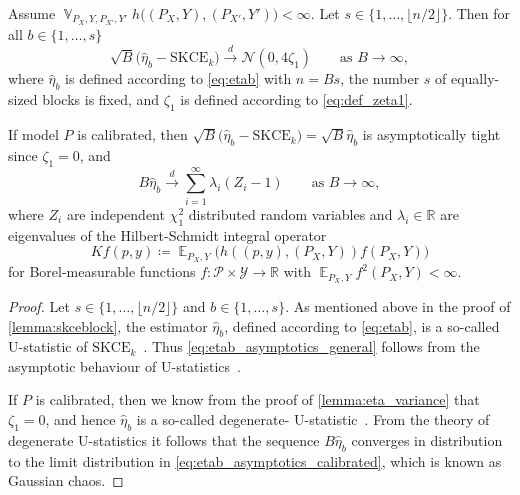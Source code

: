 \documentclass{article}
\DeclareMathOperator{\Exp}{\mathbb{E}}
\DeclareMathOperator{\Var}{\mathbb{V}}
\begin{document}
\begin{corollary}\label{corr:eta_limit}
Assume $\Var_{P_X,Y,P_{X'},Y'} h\big((P_X, Y), (P_{X'}, Y')\big) < \infty$.
Let $s \in \{1, \ldots, \lfloor n / 2 \rfloor \}$. Then for all
$b \in \{1, \ldots, s\}$
\begin{equation}\label{eq:etab_asymptotics_general}
    \sqrt{B} \big(\widehat{\eta}_{b} - \mathrm{SKCE}_k\big)
    \xrightarrow{d} \mathcal{N}(0, 4 \zeta_1) \qquad \text{as } B \to \infty,
\end{equation}
where $\widehat{\eta}_b$ is defined according to \cref{eq:etab} with
$n = B s$, the number $s$ of equally-sized blocks is fixed,
and $\zeta_1$ is defined according to \cref{eq:def_zeta1}.

If model $P$ is calibrated, then
$\sqrt{B}\big(\widehat{\eta}_{b} - \mathrm{SKCE}_k\big)
= \sqrt{B} \widehat{\eta}_{b}$
is
asymptotically tight since $\zeta_1 = 0$, and
\begin{equation}\label{eq:etab_asymptotics_calibrated}
    B \widehat{\eta}_{b} \xrightarrow{d} \sum_{i=1}^\infty \lambda_i (Z_i - 1) \qquad \text{as } B \to \infty,
\end{equation}
where $Z_i$ are independent $\chi^2_1$ distributed random variables
and $\lambda_i \in \mathbb{R}$ are eigenvalues of the Hilbert-Schmidt integral
operator
\begin{equation*}
    K f(p, y) \coloneqq \Exp_{P_X,Y}\big(h((p, y), (P_X, Y)) f(P_X, Y)\big)
\end{equation*}
for Borel-measurable functions
$f \colon \mathcal{P} \times \mathcal{Y} \to \mathbb{R}$
with $\Exp_{P_X,Y} f^2(P_X, Y) < \infty$.
\end{corollary}

\begin{proof}
Let $s \in \{1, \ldots, \lfloor n / 2 \rfloor \}$ and $b \in \{1, \ldots, s\}$.
As mentioned above in the proof of \cref{lemma:skceblock}, the estimator
$\widehat{\eta}_b$, defined according to \cref{eq:etab}, is a so-called
U-statistic of $\mathrm{SKCE}_k$~\citep[see, e.g.,][]{Vaart1998}. Thus
\cref{eq:etab_asymptotics_general} follows from the asymptotic behaviour
of U-statistics~\citep[see, e.g.,][Theorem~12.3]{Vaart1998}.

If $P$ is calibrated, then we know from the proof of \cref{lemma:eta_variance}
that $\zeta_1 = 0$, and hence $\widehat{\eta}_b$ is a so-called degenerate-
U-statistic~\citep[see, e.g.,][Section~12.3]{Vaart1998}. From the theory
of degenerate U-statistics it follows that the sequence
$B \widehat{\eta}_b$ converges in distribution
to the limit distribution in \cref{eq:etab_asymptotics_calibrated},
which is known as Gaussian chaos.
\end{proof}
\end{document}
